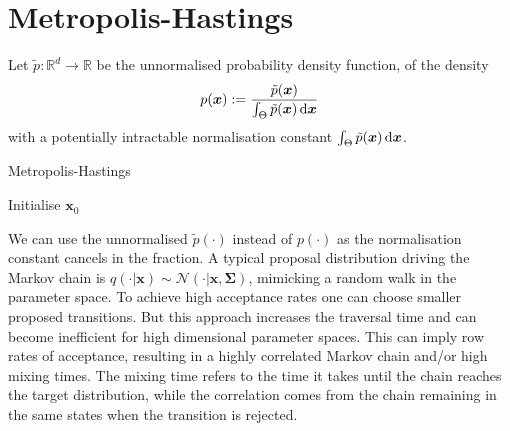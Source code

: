 

\section{Metropolis-Hastings}

Let $\tilde{p}: \mathbb{R}^d \to \mathbb{R}$ be the unnormalised probability density function, of the density
\[
	p(\bm{x}) := \frac{ \tilde{p}(\bm{x}) }{ \int_{\Theta} \tilde{p}(\bm{x}) \mathop{}\!\mathrm{d} \bm{x} }
\]
with a potentially intractable normalisation constant $\int_{\Theta} \tilde{p}(\bm{x}) \mathop{}\!\mathrm{d} \bm{x}$.

\NoCaptionOfAlgo
\begin{algorithm}[H]
\SetAlgoLined
\DontPrintSemicolon
{}
\SetAlCapSkip{1em}
\SetAlCapNameFnt{\normalfont\normalsize}
\caption{Metropolis-Hastings}

Initialise $\bm{x}_0$ \;

\end{algorithm}

We can use the unnormalised $\tilde{p}( \cdot )$ instead of $p( \cdot )$ as the normalisation constant cancels in the fraction.
A typical proposal distribution driving the Markov chain is $q(\cdot | \bm{x}) \sim \mathcal{N}( \cdot | \bm{x}, \bm{\Sigma})$, 
mimicking a random walk in the parameter space.
To achieve high acceptance rates one can choose smaller proposed transitions.
But this approach increases the traversal time and can become inefficient for high dimensional parameter spaces.
This can imply row rates of acceptance, resulting in a highly correlated Markov chain and/or high mixing times.
The mixing time refers to the time it takes until the chain reaches the target distribution, 
while the correlation comes from the chain remaining in the same states when the transition is rejected.
























